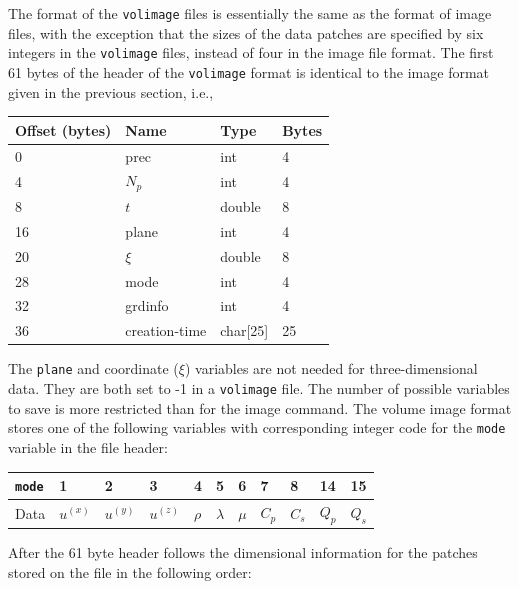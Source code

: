 \documentclass[11pt]{report}
\begin{document}
The format of the \verb+volimage+ files is essentially the same as the format of image files, with the
exception that the sizes of the data patches are specified by six integers in the \verb+volimage+ files,
instead of four in the image file format.  The first 61 bytes of the header of the \verb+volimage+ format is
identical to the image format given in the previous section, i.e.,
\begin{center}
\begin{tabular}{llll}\hline
Offset (bytes) & Name & Type & Bytes \\ \hline
0 & prec   & int & 4 \\ \hline
4 & $N_p$  & int & 4 \\ \hline
8 & $t$    & double & 8 \\ \hline
16 & plane & int & 4 \\ \hline
20 & $\xi$ & double & 8 \\ \hline
28 & mode  & int & 4 \\ \hline
32 & grdinfo & int & 4 \\ \hline
36 & creation-time & char[25] & 25 \\ \hline
\end{tabular}
\end{center}
The \verb+plane+ and coordinate ($\xi$) variables are not needed for three-dimensional data. They are both
set to -1 in a \verb+volimage+ file.  The number of possible variables to save is more restricted
than for the image command. The volume image format stores one of the following variables with
corresponding integer code for the \verb+mode+ variable in the file header:
\begin{center}
\begin{tabular}{l||l|l|l|l|l|l|l|l|l|l}\hline
{\tt mode} & 1 & 2 & 3 & 4 & 5 & 6 & 7 & 8 & 14 & 15 \\ \hline
Data & $u^{(x)}$ & $u^{(y)}$ & $u^{(z)}$ & $\rho$ & $\lambda$ & $\mu$ & $C_p$ & $C_s$ & $Q_p$ & $Q_s$ \\ \hline 
\end{tabular}
\end{center}
After the 61 byte header follows the dimensional information for the patches stored on
the file in the following order:
\end{document}
